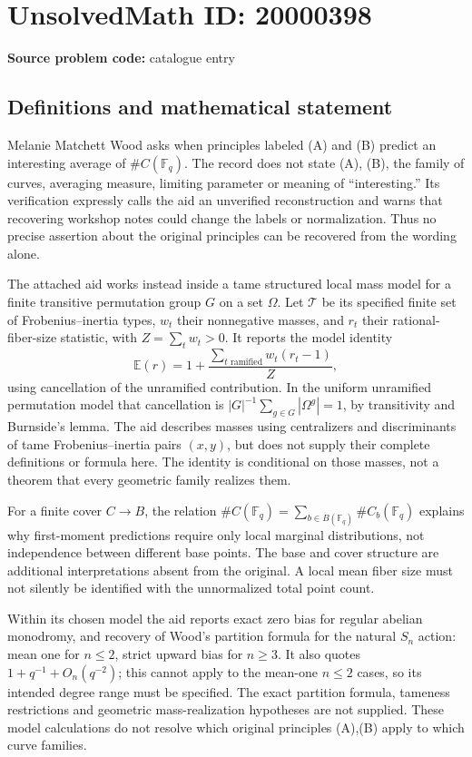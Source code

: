 \documentclass[11pt]{article}
\newcommand{\F}{\mathbb{F}}
\newcommand{\E}{\mathbb{E}}
\begin{document}
\section*{UnsolvedMath ID: 20000398}
\textbf{Source problem code:} catalogue entry
\subsection{Definitions and mathematical statement}
Melanie Matchett Wood asks when principles labeled (A) and (B) predict an interesting average of $\#C(\F_q)$. The record does not state (A), (B), the family of curves, averaging measure, limiting parameter or meaning of ``interesting.'' Its verification expressly calls the aid an unverified reconstruction and warns that recovering workshop notes could change the labels or normalization. Thus no precise assertion about the original principles can be recovered from the wording alone.

The attached aid works instead inside a tame structured local mass model for a finite transitive permutation group $G$ on a set $\Omega$. Let $\mathcal T$ be its specified finite set of Frobenius--inertia types, $w_t$ their nonnegative masses, and $r_t$ their rational-fiber-size statistic, with $Z=\sum_t w_t>0$. It reports the model identity
\[
\E(r)=1+\frac{\sum_{t\text{ ramified}}w_t(r_t-1)}{Z},
\]
using cancellation of the unramified contribution. In the uniform unramified permutation model that cancellation is $|G|^{-1}\sum_{g\in G}|\Omega^g|=1$, by transitivity and Burnside's lemma. The aid describes masses using centralizers and discriminants of tame Frobenius--inertia pairs $(x,y)$, but does not supply their complete definitions or formula here. The identity is conditional on those masses, not a theorem that every geometric family realizes them.

For a finite cover $C\to B$, the relation $\#C(\F_q)=\sum_{b\in B(\F_q)}\#C_b(\F_q)$ explains why first-moment predictions require only local marginal distributions, not independence between different base points. The base and cover structure are additional interpretations absent from the original. A local mean fiber size must not silently be identified with the unnormalized total point count.

Within its chosen model the aid reports exact zero bias for regular abelian monodromy, and recovery of Wood's partition formula for the natural $S_n$ action: mean one for $n\le2$, strict upward bias for $n\ge3$. It also quotes $1+q^{-1}+O_n(q^{-2})$; this cannot apply to the mean-one $n\le2$ cases, so its intended degree range must be specified. The exact partition formula, tameness restrictions and geometric mass-realization hypotheses are not supplied. These model calculations do not resolve which original principles (A),(B) apply to which curve families.
\end{document}
